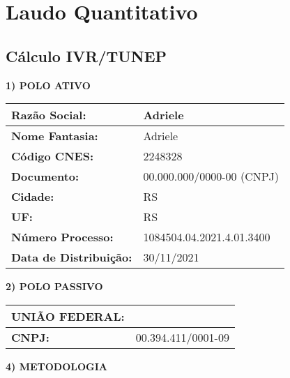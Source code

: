 \documentclass{article}
\begin{document}
    
    \section*{Laudo Quantitativo}
    \subsection*{Cálculo IVR/TUNEP}
    
    \textbf{1) POLO ATIVO}
    
    \begin{tabular}{|l|l|}
    \hline
    \textbf{Razão Social:} & Adriele \\ 
    \hline
    \textbf{Nome Fantasia:} & Adriele \\
    \hline
    \textbf{Código CNES:} & 2248328 \\
    \hline
    \textbf{Documento:} & 00.000.000/0000-00 (CNPJ) \\
    \hline
    \textbf{Cidade:} & RS \\
    \hline
    \textbf{UF:} & RS \\
    \hline
    \textbf{Número Processo:} & 1084504.04.2021.4.01.3400 \\
    \hline
    \textbf{Data de Distribuição:} & 30/11/2021 \\
    \hline
    \end{tabular}
    
    \vspace{10mm}
    
    \textbf{2) POLO PASSIVO}
    
    \begin{tabular}{|l|l|}
    \hline
    \textbf{UNIÃO FEDERAL:} & \\
    \hline
    \textbf{CNPJ:} & 00.394.411/0001-09 \\
    \hline
    \end{tabular}
    
    \vspace{10mm}
    
    \textbf{4) METODOLOGIA}
    
\end{document}
